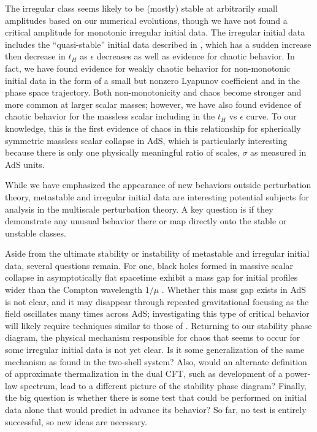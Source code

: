 \documentclass[../PhD.tex]{subfiles}
\begin{document}
The irregular class seems likely to be (mostly) stable at arbitrarily small
amplitudes based on our numerical evolutions, though we have not found a
critical amplitude for monotonic irregular initial data.  The irregular
initial data includes the ``quasi-stable'' initial data described in
\cite{1304.4166,1508.02709}, which has a sudden increase then decrease in
$t_H$ as $\epsilon$ decreases as well as evidence for chaotic behavior.  
In fact,
we have found evidence for weakly chaotic behavior 
for non-monotonic initial data in the form of a small but nonzero Lyapunov
coefficient and in the phase space trajectory.  Both
non-monotonicity and chaos become stronger and more common at larger scalar
masses; however, we have also found evidence of chaotic behavior for the 
massless scalar including in the $t_H$ vs $\epsilon$ curve. 
To our knowledge, this is the first evidence of chaos in this relationship
for spherically
symmetric massless scalar collapse in AdS, which is particularly interesting
because there is only one physically meaningful ratio of scales, $\sigma$
as measured in AdS units.

While we have emphasized the appearance of new behaviors outside
perturbation theory, metastable and irregular initial data are
interesting potential subjects for analysis in the multiscale
perturbation theory. A key question is if they demonstrate any unusual
behavior there or map directly onto the stable or unstable classes.

Aside from the ultimate stability or instability of metastable and
irregular initial data, several questions remain.  
For one, black holes formed in
massive scalar collapse in asymptotically flat spacetime exhibit a mass
gap for initial profiles wider than the Compton wavelength $1/\mu$
\cite{Brady1997}.  Whether this mass gap exists in AdS is not clear, and it
may disappear through repeated gravitational focusing as the field oscillates
many times across AdS; investigating this type of critical behavior will
likely require techniques similar to those of \cite{Santos-Olivan:2016djn}.
Returning to our stability 
phase diagram, the physical mechanism responsible for chaos that seems to occur
for some irregular initial data 
is not yet clear.  Is it some generalization of the
same mechanism as found in the two-shell system?  Also, would an alternate
definition of approximate thermalization in the dual CFT, such as development
of a power-law spectrum, lead to a different picture of the stability
phase diagram?
Finally, the big question is whether there is some test that could be performed
on initial data alone that would predict in advance its behavior? So far, no
test is entirely successful, so new ideas are necessary.
\end{document}
